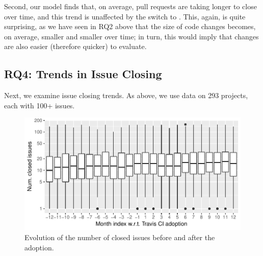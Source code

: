 Second, our model finds that, on average, pull requests are taking longer to close 
over time, and this trend is unaffected by the switch to \Tvis.
This, again, is quite surprising, as we have seen in RQ2 above that the size of 
code changes becomes, on average, smaller and smaller over time; in turn, this
would imply that changes are also easier (therefore quicker) to evaluate.



\subsection{RQ4: Trends in Issue Closing}

Next, we examine issue closing trends.
As above, we use data on 293 projects, each with 
100+ issues.

\begin{figure}[t]
\centering
\includegraphics[width=\columnwidth, clip=true, trim=0 0 0 0]{figures/issues.pdf}
\caption{Evolution of the number of closed issues before and after the \Tvis adoption.}
\label{fig:issues}
\end{figure}






%
%
%

